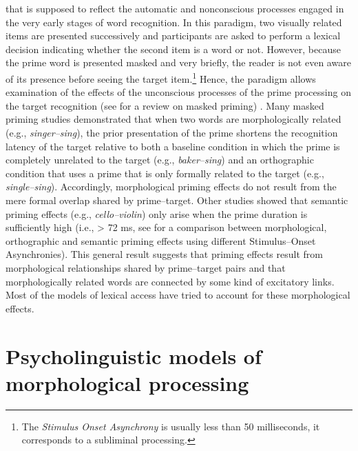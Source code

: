 \documentclass[output=paper]{langsci/langscibook}
\begin{document}
\citep{ForsterDavis1984}
 that is supposed to reflect the automatic and
nonconscious processes engaged in the very early stages of word
recognition. In this paradigm, two visually related items are presented
successively and participants are asked to perform a lexical decision
indicating whether the second item is a word or not. However, because
the prime word is presented masked and very briefly, the reader is not even
aware of its presence before seeing the target item.\footnote{The
  \emph{Stimulus Onset Asynchrony} is usually less than 50 milliseconds,
  it corresponds to a subliminal processing.} Hence, the paradigm
allows examination of  the effects of the unconscious processes of the prime
processing on the target recognition %
(see 
\citealt{KinoshitaLupker2004} %
 for a review on masked priming)
%
%
. Many masked priming studies demonstrated
that when two words are morphologically related (e.g.,
\emph{singer--sing}), the prior presentation of the prime shortens the
recognition latency of the target relative to both a baseline condition
in which the prime is completely unrelated to the target (e.g.,
\emph{baker--sing}) and an orthographic condition that uses a prime that
is only formally related to the target (e.g., \emph{single--sing}).
Accordingly, morphological priming effects do not result from the mere
formal overlap shared by prime--target. Other studies showed that
semantic priming effects (e.g., \emph{cello--violin}) only arise when the
prime duration is sufficiently high %
(i.e., \textgreater{} 72 ms, see %
\citealt{RastleDavisEtAl2000} %
 for a comparison between morphological, orthographic and semantic priming effects using different Stimulus--Onset Asynchronies). This general result suggests that priming effects result from
morphological relationships shared by prime--target pairs and that
morphologically related words are connected by some kind of excitatory
links. Most of the models of lexical access have tried to account for these
morphological effects.

\section{ Psycholinguistic models of morphological
processing}\label{psycholinguistic-models-of-morphological-processing}
\end{document}

